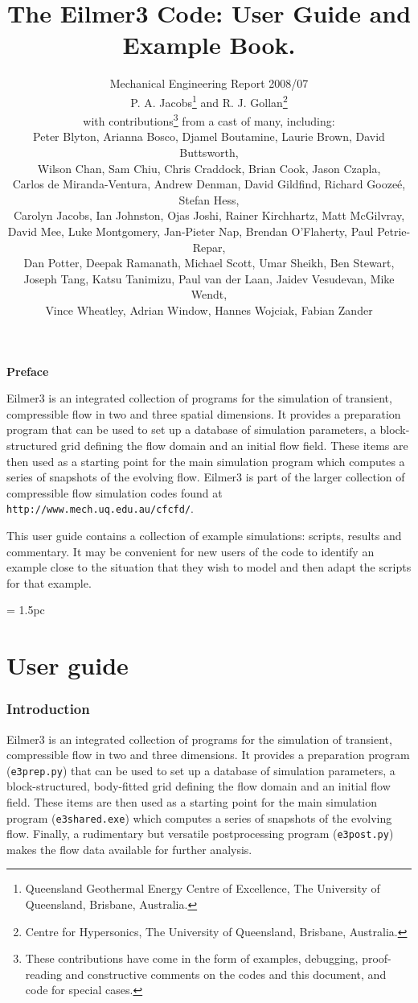 \documentclass[12pt,a4paper,twoside]{article}
\title{
    The Eilmer3 Code: User Guide and Example Book.
}
\author{
    Mechanical Engineering Report 2008/07\\
    P. A. Jacobs\thanks{Queensland Geothermal Energy Centre of Excellence, The University of Queensland, Brisbane, Australia.} 
    and 
    R. J. Gollan\thanks{Centre for Hypersonics, The University of Queensland, Brisbane, Australia.}\\
    {\normalsize with contributions\thanks{These contributions have come in the form of examples, debugging, 
    proof-reading and constructive comments on the codes and this document, and code for special cases.}
    from a cast of many, including:}\\
    {\normalsize Peter Blyton,}
    {\normalsize Arianna Bosco,}
    {\normalsize Djamel Boutamine,}
    {\normalsize Laurie Brown,}
    {\normalsize David Buttsworth,} \\
    {\normalsize Wilson Chan,} 
    {\normalsize Sam Chiu,}
    {\normalsize Chris Craddock,} 
    {\normalsize Brian Cook,} 
    {\normalsize Jason Czapla,} \\
    {\normalsize Carlos de Miranda-Ventura,} 
    {\normalsize Andrew Denman,} 
    {\normalsize David Gildfind,} 
    {\normalsize Richard Gooze\'{e},}
    {\normalsize Stefan Hess,} \\
    {\normalsize Carolyn Jacobs,} 
    {\normalsize Ian Johnston,}
    {\normalsize Ojas Joshi,}
    {\normalsize Rainer Kirchhartz,} 
    {\normalsize Matt McGilvray,} \\
    {\normalsize David Mee,} 
    {\normalsize Luke Montgomery,} 
    {\normalsize Jan-Pieter Nap,} 
    {\normalsize Brendan O'Flaherty,} 
    {\normalsize Paul Petrie-Repar,} \\
    {\normalsize Dan Potter,} 
    {\normalsize Deepak Ramanath,}
    {\normalsize Michael Scott,}
    {\normalsize Umar Sheikh,} 
    {\normalsize Ben Stewart,} \\
    {\normalsize Joseph Tang,} 
    {\normalsize Katsu Tanimizu,} 
    {\normalsize Paul van der Laan,} 
    {\normalsize Jaidev Vesudevan,} 
    {\normalsize Mike Wendt,} \\
    {\normalsize Vince Wheatley,} 
    {\normalsize Adrian Window,} 
    {\normalsize Hannes Wojciak,}
    {\normalsize Fabian Zander}
}
\begin{document}
\maketitle

\centerline{\textbf{Preface}}
Eilmer3 is an integrated collection of programs for the simulation of transient,
compressible flow in two and three spatial dimensions.
It provides a preparation program that can be used to set up a database of
simulation parameters, a block-structured grid defining the flow domain and an
initial flow field.
These items are then used as a starting point for the main simulation program
which computes a series of snapshots of the evolving flow.
Eilmer3 is part of the larger collection of compressible flow simulation codes
found at \texttt{http://www.mech.uq.edu.au/cfcfd/}.

\medskip
This user guide contains a collection of example simulations: scripts, results
and commentary.
It may be convenient for new users of the code to identify an example
close to the situation that they wish to model and then adapt the 
scripts for that example.

\cleardoublepage
\tableofcontents

\cleardoublepage
\baselineskip = 1.5pc

\part{User guide}

\section{Introduction}
%
Eilmer3 is an integrated collection of programs for the simulation of transient,
compressible flow in two and three dimensions.
It provides a preparation program (\texttt{e3prep.py}) that can be used to set up a database of
simulation parameters, a block-structured, body-fitted grid defining the flow domain and an
initial flow field.
These items are then used as a starting point for the main simulation program (\texttt{e3shared.exe})
which computes a series of snapshots of the evolving flow.
Finally, a rudimentary but versatile postprocessing program (\texttt{e3post.py}) makes the flow data
available for further analysis.
\end{document}
